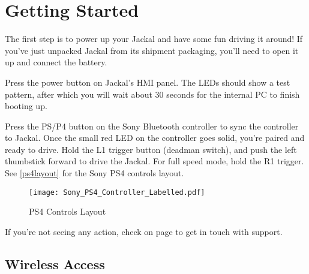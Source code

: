 \documentclass[]{clearpath-latex/clearpath-manual}
\begin{document}


\begin{comment}
\autoref{arch} is a high-level overview of the ROS
nodes in base Jackal and the data flow through them.

\begin{figure}[hb]
  \centering\footnotesize
  \placeholder{16cm}{18cm}
  \caption{ROS nodes and topics on Jackal.}
  \label{arch}
\end{figure}
\end{comment}

\section{Getting Started}

The first step is to power up your Jackal and have some fun driving it around! If you've
just unpacked Jackal from its shipment packaging, you'll need to open it up and connect the
battery.

Press the power button  on
Jackal's HMI panel. The LEDs should show a test pattern, after which you will wait about 30
seconds for the internal PC to finish booting up.


Press the PS/P4 button on the Sony Bluetooth controller to sync the controller to Jackal. Once
the small red LED on the controller goes solid, you're paired and ready to drive. Hold the L1 trigger
button (deadman switch), and push the left thumbstick forward to drive the Jackal. For full speed mode, hold the R1 trigger.  See \autoref{ps4layout} for the Sony PS4 controls layout.

\begin{figure}[H]
  \centering
  \texttt{[image: Sony\_PS4\_Controller\_Labelled.pdf]}
  \caption{PS4 Controls Layout}
  \label{ps4layout}
\end{figure}


If you're not seeing any action, check  on page \pageref{trouble} to
get in touch with support.

\subsection{Wireless Access}
\end{document}
